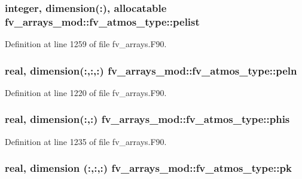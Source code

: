\subsubsection[{pelist}]{\setlength{\rightskip}{0pt plus 5cm}integer, dimension(\-:), allocatable fv\-\_\-arrays\-\_\-mod\-::fv\-\_\-atmos\-\_\-type\-::pelist}\label{structfv__arrays__mod_1_1fv__atmos__type_aa3b9aaaf36503aad223be6c46d21a3b5}


Definition at line 1259 of file fv\-\_\-arrays.\-F90.

\subsubsection[{peln}]{\setlength{\rightskip}{0pt plus 5cm}real, dimension(\-:,\-:,\-:) fv\-\_\-arrays\-\_\-mod\-::fv\-\_\-atmos\-\_\-type\-::peln}\label{structfv__arrays__mod_1_1fv__atmos__type_a438aadd63c30fec4db3ad811ecb3f81a}


Definition at line 1220 of file fv\-\_\-arrays.\-F90.

\subsubsection[{phis}]{\setlength{\rightskip}{0pt plus 5cm}real, dimension(\-:,\-:) fv\-\_\-arrays\-\_\-mod\-::fv\-\_\-atmos\-\_\-type\-::phis}\label{structfv__arrays__mod_1_1fv__atmos__type_ac6cfc672780cbc8b5fab0ca13e1a7590}


Definition at line 1235 of file fv\-\_\-arrays.\-F90.

\subsubsection[{pk}]{\setlength{\rightskip}{0pt plus 5cm}real, dimension  (\-:,\-:,\-:) fv\-\_\-arrays\-\_\-mod\-::fv\-\_\-atmos\-\_\-type\-::pk}\label{structfv__arrays__mod_1_1fv__atmos__type_a0882342b11ac2963886233f84c1ca2ec}


